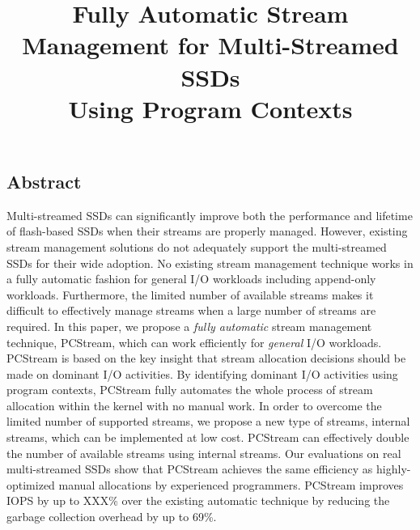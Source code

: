\documentclass[letterpaper, twocolumn, 10pt]{article}
\begin{document}
\title{
\bf Fully Automatic Stream Management for Multi-Streamed SSDs \\ Using Program Contexts}

%


\maketitle
\pagestyle{empty}
\subsection*{Abstract}
Multi-streamed SSDs
can significantly improve both the performance and lifetime of flash-based SSDs
when their streams are properly managed.  
However, existing stream management solutions do not adequately 
support the multi-streamed SSDs for their wide adoption.
No existing stream management technique works in a fully automatic fashion 
for general I/O workloads including append-only workloads.  
Furthermore, the limited number of available
streams makes it difficult to effectively manage streams 
when a large number of streams are required.
In this paper, we propose a {\it fully automatic} stream
management technique, \textsf{\small PCStream}, which can work efficiently for {\it general} I/O workloads.
\textsf{\small PCStream} is based on the key insight that stream allocation decisions should be made on 
dominant I/O activities. By identifying dominant I/O activities using program contexts, 
\textsf{\small PCStream} fully automates the whole process of stream allocation 
within the kernel with no manual work.
In order to overcome the limited number of supported streams, we propose a new 
type of streams, internal streams, which can be implemented at low cost.
\textsf{\small PCStream} can effectively double the number of available streams using internal streams.
Our evaluations on real multi-streamed SSDs show that 
\textsf{\small PCStream} achieves the same efficiency as highly-optimized manual allocations
by experienced programmers.
\textsf{\small PCStream} improves IOPS by up to XXX\% over the existing automatic technique
by reducing the garbage collection overhead by up to 69\%.









\end{document}

